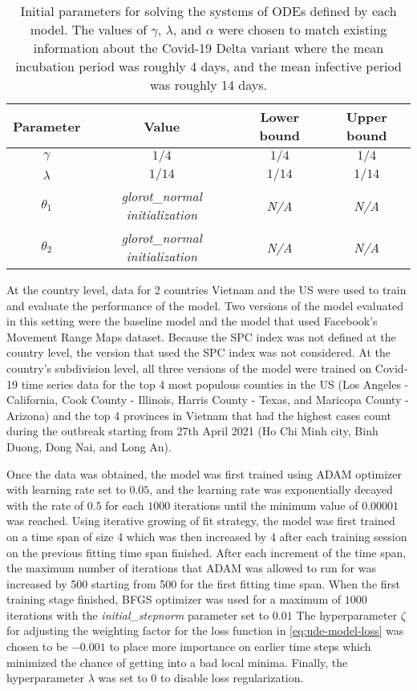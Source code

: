\begin{table}[h]
    \centering
    \begin{tabular}{| c | c | c | c |}
        Parameter & Value & Lower bound & Upper bound \\
        \hline\hline
        $\gamma$ & $1/4$ & $1/4$ & $1/4$ \\
        \hline
        $\lambda$ & $1/14$ & $1/14$ & $1/14$ \\
        \hline
        $\theta_1$ & \textit{glorot\_normal initialization} & \textit{N/A} & \textit{N/A} \\
        \hline
        $\theta_2$ & \textit{glorot\_normal initialization} & \textit{N/A} & \textit{N/A} \\
        \hline
    \end{tabular}
    \caption{Initial parameters for solving the systems of \glspl{ODE} defined by each model. The values of $\gamma$, $\lambda$, and $\alpha$ were chosen to match existing information about the Covid-19 Delta variant \cite{mahaseDeltaVariantWhat2021} where the mean incubation period was roughly 4 days, and the mean infective period was roughly 14 days.}
    \label{tab:ude-model-initial-parameters}
\end{table}

At the country level, data for 2 countries Vietnam and the \gls{US} were used to train and evaluate the performance of the model.
Two versions of the model evaluated in this setting were the baseline model and the model that used Facebook's Movement Range Maps dataset.
Because the \gls{SPC} index was not defined at the country level, the version that used the \gls{SPC} index was not considered.
At the country's subdivision level, all three versions of the model were trained on Covid-19 time series data for the top 4 most populous counties in the \gls{US} (Los Angeles - California, Cook County - Illinois, Harris County - Texas, and Maricopa County - Arizona) and the top 4 provinces in Vietnam that had the highest cases count during the outbreak starting from 27th April 2021 (Ho Chi Minh city, Binh Duong, Dong Nai, and Long An).

Once the data was obtained, the model was first trained using ADAM optimizer with learning rate set to $0.05$, and the learning rate was exponentially decayed with the rate of $0.5$ for each $1000$ iterations until the minimum value of $0.00001$ was reached.
Using iterative growing of fit strategy, the model was first trained on a time span of size 4 which was then increased by 4 after each training session on the previous fitting time span finished.
After each increment of the time span, the maximum number of iterations that ADAM was allowed to run for was increased by 500 starting from 500 for the first fitting time span.
When the first training stage finished, BFGS optimizer was used for a maximum of $1000$ iterations with the \textit{initial\_stepnorm} parameter set to $0.01$
The hyperparameter $\zeta$ for adjusting the weighting factor for the loss function in \autoref{eq:ude-model-loss} was chosen to be $-0.001$ to place more importance on earlier time steps which minimized the chance of getting into a bad local minima.
Finally, the hyperparameter $\lambda$ was set to $0$ to disable loss regularization.

